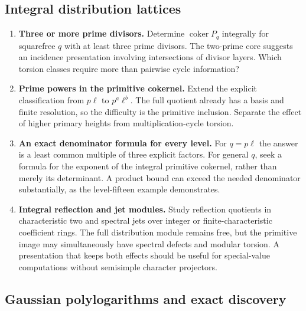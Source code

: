\subsection{Integral distribution lattices}

\begin{enumerate}[leftmargin=*,label=D\arabic*.]
\item \textbf{Three or more prime divisors.} Determine
$\operatorname{coker}P_q$ integrally for squarefree $q$ with at
least three prime divisors. The two-prime core suggests an
incidence presentation involving intersections of divisor layers.
Which torsion classes require more than pairwise cycle information?

\item \textbf{Prime powers in the primitive cokernel.} Extend
the explicit classification from $p\ell$ to $p^a\ell^b$.
The full quotient already has a basis and finite resolution, so
the difficulty is the primitive inclusion. Separate the effect
of higher primary heights from multiplication-cycle torsion.

\item \textbf{An exact denominator formula for every level.}
For $q=p\ell$ the answer is a least common multiple of three
explicit factors. For general $q$, seek a formula for the exponent
of the integral primitive cokernel, rather than merely its
determinant. A product bound can exceed the needed denominator
substantially, as the level-fifteen example demonstrates.

\item \textbf{Integral reflection and jet modules.} Study
reflection quotients in characteristic two and spectral jets over
integer or finite-characteristic coefficient rings. The full
distribution module remains free, but the primitive image may
simultaneously have spectral defects and modular torsion. A
presentation that keeps both effects should be useful for
special-value computations without semisimple character projectors.
\end{enumerate}

\subsection{Gaussian polylogarithms and exact discovery}

